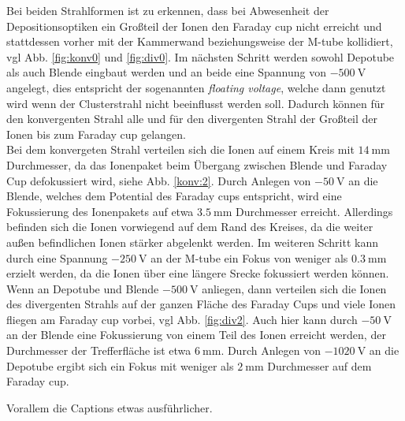 Bei beiden Strahlformen ist zu erkennen, dass bei Abwesenheit der Depositionsoptiken ein Großteil der Ionen den Faraday cup nicht erreicht und stattdessen vorher mit der Kammerwand beziehungsweise der M-tube kollidiert, vgl Abb. \ref{fig:konv0} und \ref{fig:div0}.
Im nächsten Schritt werden sowohl Depotube als auch Blende eingbaut werden und an beide eine Spannung von $\SI{-500}{\volt}$ angelegt, dies entspricht der sogenannten \textit{floating voltage}, welche dann genutzt wird wenn der Clusterstrahl nicht beeinflusst werden soll.
Dadurch können für den konvergenten Strahl alle und für den divergenten Strahl der Großteil der Ionen bis zum Faraday cup gelangen.\\

Bei dem konvergeten Strahl verteilen sich die Ionen auf einem Kreis mit $\SI{14}{\mm}$ Durchmesser, da das Ionenpaket beim Übergang zwischen Blende und Faraday Cup defokussiert wird, siehe Abb. \ref{konv:2}.
Durch Anlegen von $\SI{-50}{\volt}$ an die Blende, welches dem Potential des Faraday cups entspricht, wird eine Fokussierung des Ionenpakets auf etwa $\SI{3,5}{\mm}$ Durchmesser erreicht.
Allerdings befinden sich die Ionen vorwiegend auf dem Rand des Kreises, da die weiter außen befindlichen Ionen stärker abgelenkt werden.
Im weiteren Schritt kann durch eine Spannung $\SI{-250}{\volt}$ an der M-tube ein Fokus von weniger als $\SI{0,3}{\mm}$ erzielt werden, da die Ionen über eine längere Srecke fokussiert werden können.\\ 

Wenn an Depotube und Blende $\SI{-500}{\volt}$ anliegen, dann verteilen sich die Ionen des divergenten Strahls auf der ganzen Fläche des Faraday Cups und viele Ionen fliegen am Faraday cup vorbei, vgl Abb. \ref{fig:div2}.
Auch hier kann durch $\SI{-50}{\volt}$ an der Blende eine Fokussierung von einem Teil des Ionen erreicht werden, der Durchmesser der Trefferfläche ist etwa $\SI{6}{\mm}$. 
Durch Anlegen von $\SI{-1020}{\volt}$ an die Depotube ergibt sich ein Fokus mit weniger als $\SI{2}{\mm}$ Durchmesser auf dem Faraday cup.

Vorallem die Captions etwas ausführlicher.





